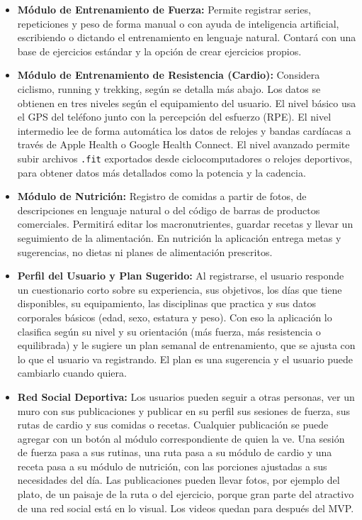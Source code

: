 \begin{itemize}
    \item \textbf{Módulo de Entrenamiento de Fuerza:} Permite registrar series, repeticiones y peso de forma manual o con ayuda de inteligencia artificial, escribiendo o dictando el entrenamiento en lenguaje natural. Contará con una base de ejercicios estándar y la opción de crear ejercicios propios.
    \item \textbf{Módulo de Entrenamiento de Resistencia (Cardio):} Considera ciclismo, running y trekking, según se detalla más abajo. Los datos se obtienen en tres niveles según el equipamiento del usuario. El nivel básico usa el GPS del teléfono junto con la percepción del esfuerzo (RPE). El nivel intermedio lee de forma automática los datos de relojes y bandas cardíacas a través de Apple Health o Google Health Connect. El nivel avanzado permite subir archivos \texttt{.fit} exportados desde ciclocomputadores o relojes deportivos, para obtener datos más detallados como la potencia y la cadencia.
    \item \textbf{Módulo de Nutrición:} Registro de comidas a partir de fotos, de descripciones en lenguaje natural o del código de barras de productos comerciales. Permitirá editar los macronutrientes, guardar recetas y llevar un seguimiento de la alimentación. En nutrición la aplicación entrega metas y sugerencias, no dietas ni planes de alimentación prescritos.
    \item \textbf{Perfil del Usuario y Plan Sugerido:} Al registrarse, el usuario responde un cuestionario corto sobre su experiencia, sus objetivos, los días que tiene disponibles, su equipamiento, las disciplinas que practica y sus datos corporales básicos (edad, sexo, estatura y peso). Con eso la aplicación lo clasifica según su nivel y su orientación (más fuerza, más resistencia o equilibrada) y le sugiere un plan semanal de entrenamiento, que se ajusta con lo que el usuario va registrando. El plan es una sugerencia y el usuario puede cambiarlo cuando quiera.
    \item \textbf{Red Social Deportiva:} Los usuarios pueden seguir a otras personas, ver un muro con sus publicaciones y publicar en su perfil sus sesiones de fuerza, sus rutas de cardio y sus comidas o recetas. Cualquier publicación se puede agregar con un botón al módulo correspondiente de quien la ve. Una sesión de fuerza pasa a sus rutinas, una ruta pasa a su módulo de cardio y una receta pasa a su módulo de nutrición, con las porciones ajustadas a sus necesidades del día. Las publicaciones pueden llevar fotos, por ejemplo del plato, de un paisaje de la ruta o del ejercicio, porque gran parte del atractivo de una red social está en lo visual. Los videos quedan para después del MVP.

\end{itemize}
